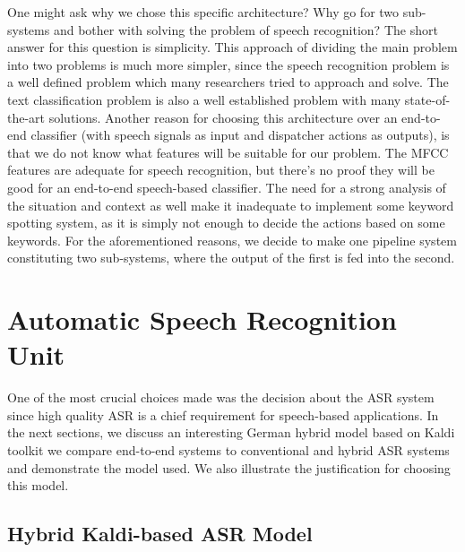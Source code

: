 One might ask why we chose this specific architecture? Why go for two sub-systems and bother with solving the problem of speech recognition? The short answer for this question is simplicity. This approach of dividing the main problem into two problems is much more simpler, since the speech recognition problem is a well defined problem which many researchers tried to approach and solve. The text classification problem is also a well established problem with many state-of-the-art solutions. Another reason for choosing this architecture over an end-to-end classifier (with speech signals as input and dispatcher actions as outputs), is that we do not know what features will be suitable for our problem. The \ac{MFCC} features are adequate for speech recognition, but there's no proof they will be good for an end-to-end speech-based classifier. The need for a strong analysis of the situation and context as well make it inadequate to implement some keyword spotting system, as it is simply not enough to decide the actions based on some keywords. For the aforementioned reasons, we decide to make one pipeline system constituting two sub-systems, where the output of the first is fed into the second.




\section{Automatic Speech Recognition Unit} 
\label{meth:s2}

One of the most crucial choices made was the decision about the \ac{ASR} system since high quality \ac{ASR} is a chief requirement for speech-based applications. In the next sections, we discuss an interesting German hybrid model based on Kaldi toolkit we compare end-to-end systems to conventional and hybrid \ac{ASR} systems and demonstrate the model used. We also illustrate the justification for choosing this model.

\subsection{Hybrid Kaldi-based ASR Model}
\label{meth:s2_sub1}

